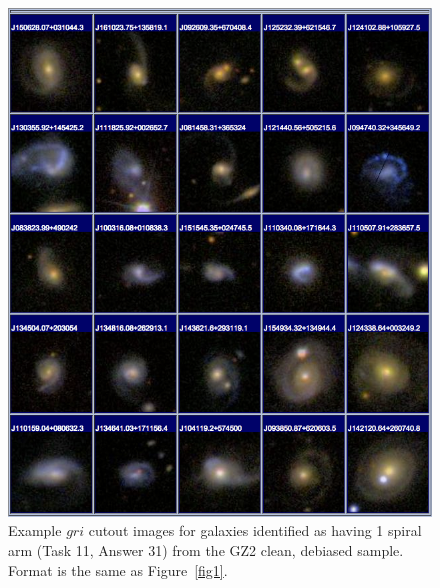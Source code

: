 \documentclass[useAMS,usenatbib]{mn2e}
\begin{document}
\newpage
\clearpage
\begin{figure}
\includegraphics[angle=0,width=7.0in]{figures/gallery/spiral1.png}
\caption{Example $gri$ cutout images for galaxies identified as having 1 spiral arm (Task 11, Answer 31) from the GZ2 clean, debiased sample. Format is the same as Figure~\ref{fig1}.}
\end{figure}
\end{document}

